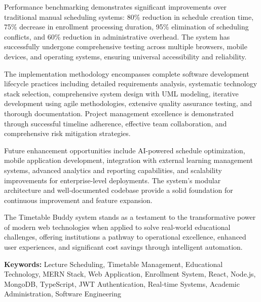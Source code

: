 \vspace{0.3cm}

Performance benchmarking demonstrates significant improvements over traditional manual scheduling systems: 80\% reduction in schedule creation time, 75\% decrease in enrollment processing duration, 95\% elimination of scheduling conflicts, and 60\% reduction in administrative overhead. The system has successfully undergone comprehensive testing across multiple browsers, mobile devices, and operating systems, ensuring universal accessibility and reliability.

\vspace{0.3cm}

The implementation methodology encompasses complete software development lifecycle practices including detailed requirements analysis, systematic technology stack selection, comprehensive system design with UML modeling, iterative development using agile methodologies, extensive quality assurance testing, and thorough documentation. Project management excellence is demonstrated through successful timeline adherence, effective team collaboration, and comprehensive risk mitigation strategies.

\vspace{0.3cm}

Future enhancement opportunities include AI-powered schedule optimization, mobile application development, integration with external learning management systems, advanced analytics and reporting capabilities, and scalability improvements for enterprise-level deployments. The system's modular architecture and well-documented codebase provide a solid foundation for continuous improvement and feature expansion.

\vspace{0.3cm}

The Timetable Buddy system stands as a testament to the transformative power of modern web technologies when applied to solve real-world educational challenges, offering institutions a pathway to operational excellence, enhanced user experiences, and significant cost savings through intelligent automation.

\vspace{0.5cm}

\textbf{Keywords:} Lecture Scheduling, Timetable Management, Educational Technology, MERN Stack, Web Application, Enrollment System, React, Node.js, MongoDB, TypeScript, JWT Authentication, Real-time Systems, Academic Administration, Software Engineering
